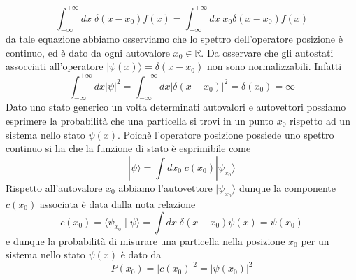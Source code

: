 \begin{equation*}
	\int_{-\infty}^{+ \infty} dx \; \delta(x-x_0)f(x)  = \int_{-\infty}^{+ \infty} dx \; x_0 \delta(x-x_0)f(x)
\end{equation*}
da tale equazione abbiamo osserviamo che lo spettro dell'operatore posizione \`e continuo, ed \`e dato da ogni autovalore $x_0 \in \mathbb{R}$. Da osservare che gli autostati assocciati all'operatore $|\psi(x) \rangle = \delta(x-x_0)$ non sono normalizzabili. Infatti
\begin{equation*}
	\int_{-\infty}^{+\infty} d x|\psi|^2=\int_{-\infty}^{+\infty} d x|\delta(x-x_0)|^2=\delta(x_0)=\infty
\end{equation*}
Dato uno stato generico un volta determinati autovalori e autovettori possiamo esprimere la probabilit\`a che una particella si trovi in un punto $x_0$ rispetto ad un sistema nello stato $\psi(x)$. Poich\`e l'operatore posizione possiede uno spettro continuo si ha che la funzione di stato \`e esprimibile  come 
\begin{equation*}
	|\psi \rangle = \int dx_0 \; c(x_0)|\psi_{x_0}\rangle  
\end{equation*}
Rispetto all'autovalore $x_0$ abbiamo l'autovettore $|\psi_{x_0}\rangle $ dunque la componente $c(x_0)$ associata \`e data dalla nota relazione 
\begin{equation*}
	c(x_0) = \langle \psi_{x_0} \; | \; \psi \rangle = \int dx \; \delta(x-x_0)\psi(x) = \psi(x_0)
\end{equation*}
e dunque la probabilit\`a di misurare una particella nella posizione $x_0$ per un sistema nello stato $\psi(x)$ \`e dato da 
\begin{equation*}
	P(x_0) = |c(x_0)|^2 = |\psi(x_0)|^2
\end{equation*}

